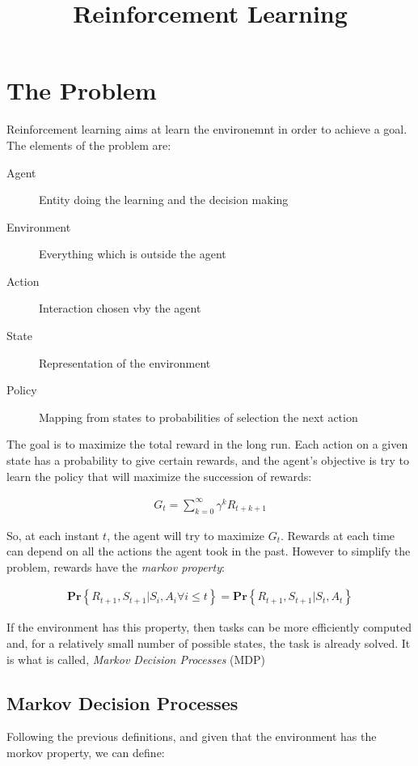 \documentclass{article}
\title{Reinforcement Learning}
\begin{document}
\maketitle
\section{The Problem}

Reinforcement learning aims at learn the environemnt in order to achieve a goal. The elements of the problem are:
\begin{description}
\item[Agent] Entity doing the learning and the decision making
\item[Environment] Everything which is outside the agent
\item[Action] Interaction chosen vby the agent
\item[State] Representation of the environment
\item[Policy] Mapping from states to probabilities of selection the next action
\end{description}

The goal is to maximize the total reward in the long run. Each action on a given state has a probability to give certain rewards, and the agent's objective is try to learn the policy that will maximize the succession of rewards:

\begin{align}
G_t = \sum_{k=0}^{\infty} \gamma^k R_{t+k+1} 
\end{align}

So, at each instant $t$, the agent will try to maximize $G_t$. Rewards at each time can depend on all the actions the agent took in the past. However to simplify the problem, rewards have the \emph{markov property}:

\begin{align}
\mathbf{Pr}\left\{R_{t+1}, S_{t+1} | S_i, A_i \forall i \leq t \right\} = \mathbf{Pr}\left\{R_{t+1}, S_{t+1} | S_t, A_t \right\} 
\end{align}

If the environment has this property, then tasks can be more efficiently computed and, for a relatively small number of possible states, the task is already solved. It is what is called, \emph{Markov Decision Processes} (MDP)

\subsection{Markov Decision Processes}
Following the previous definitions, and given that the environment has the morkov property, we can define:
\end{document}
